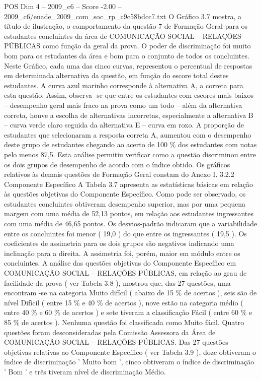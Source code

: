 \begin{textsample}{POS Dim 4 – 2009\_c6 – Score -2.00 – 2009\_c6/enade\_2009\_com\_soc\_rp\_c9c58bdcc7.txt}
O Gráfico 3.7 mostra, a título de ilustração, o comportamento da questão 7 de Formação Geral para os estudantes concluintes da área de COMUNICAÇÃO SOCIAL – RELAÇÕES PÚBLICAS como função da geral da prova.
O poder de discriminação foi muito bom para os estudantes da área e bom para o conjunto de todos os concluintes.
Neste Gráfico, cada uma das cinco curvas, representou o percentual de respostas em determinada alternativa da questão, em função do escore total destes estudantes.
A curva azul marinho corresponde à alternativa A, a correta para esta questão.
Assim, observa -se que entre os estudantes com escores mais baixos – desempenho geral mais fraco na prova como um todo – além da alternativa correta, houve a escolha de alternativas incorretas, especialmente a alternativa B – curva verde claro seguida da alternativa E – curva em roxo.
A proporção de estudantes que selecionaram a resposta correta A, aumentou com o desempenho deste grupo de estudantes chegando ao acerto de 100 \% dos estudantes com notas pelo menos 87,5.
Esta análise permitiu verificar como a questão discriminou entre os dois grupos de desempenho de acordo com o índice obtido.
Os gráficos relativos às demais questões de Formação Geral constam do Anexo I. 3.2.2 Componente Específico A Tabela 3.7 apresenta as estatísticas básicas em relação às questões objetivas do Componente Específico.
Como pode ser observado, os estudantes concluintes obtiveram desempenho superior, mas por uma pequena margem com uma média de 52,13 pontos, em relação aos estudantes ingressantes com uma média de 46,65 pontos.
Os desvios-padrão indicaram que a variabilidade entre os concluintes foi menor ( 19,0 ) do que entre os ingressantes ( 19,5 ).
Os coeficientes de assimetria para os dois grupos são negativos indicando uma inclinação para a direita.
A assimetria foi, porém, maior em módulo entre os concluintes.
A análise das questões objetivas do Componente Específico em COMUNICAÇÃO SOCIAL – RELAÇÕES PÚBLICAS, em relação ao grau de facilidade da prova ( ver Tabela 3.8 ), mostrou que, das 27 questões, uma encontram -se na categoria Muito difícil ( abaixo de 15 \% de acertos ), seis são de nível Difícil ( entre 15 \% e 40 \% de acertos ), nove estão na categoria médio ( entre 40 \% e 60 \% de acertos ) e sete tiveram a classificação Fácil ( entre 60 \% e 85 \% de acertos ).
Nenhuma questão foi classificada como Muito fácil.
Quatro questões foram desconsideradas pela Comissão Assessora da Área de COMUNICAÇÃO SOCIAL – RELAÇÕES PÚBLICAS.
Das 27 questões objetivas relativas ao Componente Específico ( ver Tabela 3.9 ), doze obtiveram o índice de discriminação ' Muito bom ', cinco obtiveram o índice de discriminação ' Bom ' e três tiveram nível de discriminação Médio.

\end{textsample}

